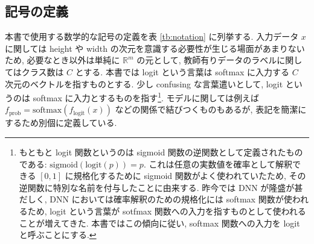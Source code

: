 \subsection{記号の定義}
\label{subsec:definition-symbols}
本書で使用する数学的な記号の定義を表 \ref{tb:notation} に列挙する.
入力データ $x$ に関しては height や width の次元を意識する必要性が生じる場面があまりないため, 必要なとき以外は単純に $\mathbb{R}^m$ の元として, 教師有りデータのラベルに関してはクラス数は $C$ とする.
本書では logit という言葉は softmax に入力する $C$ 次元のベクトルを指すものとする.
少し confusing な言葉遣いとして, logit というのは softmax に入力とするものを指す\footnote{
もともと logit 関数というのは sigmoid 関数の逆関数として定義されたものである: $\text{sigmoid} ( \text{logit}(p)) = p$.
これは任意の実数値を確率として解釈できる $[0, 1]$ に規格化するために sigmoid 関数がよく使われていたため, その逆関数に特別な名前を付与したことに由来する.
昨今では DNN が隆盛が甚だしく, DNN においては確率解釈のための規格化には softmax 関数が使われるため, logit という言葉が sotfmax 関数への入力を指すものとして使われることが増えてきた.
本書ではこの傾向に従い, softmax 関数への入力を logit と呼ぶことにする.
}.
モデルに関しては例えば $f_{\text{prob}} = \text{softmax} (f_{\text{logit}}(x))$ などの関係で結びつくものもあるが, 表記を簡潔にするため別個に定義している.
%
